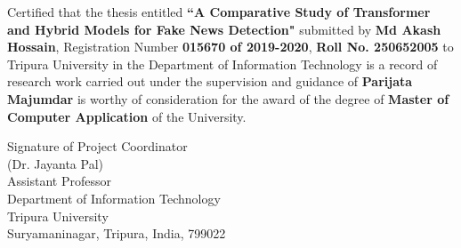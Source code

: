 \noindent Certified that the thesis entitled {\bf ``A Comparative Study of Transformer and Hybrid Models for Fake News Detection"} submitted by {\bf Md Akash Hossain}, Registration Number {\bf 015670 of 2019-2020}, {\bf Roll No. 250652005} to Tripura University in the Department of Information Technology is a record of research work carried out under the supervision and guidance of {\bf Parijata Majumdar} is worthy of consideration for the award of the degree of {\bf Master of Computer Application} of the University.

\vspace{1.1 in}
\begin{flushright}
Signature of Project Coordinator\\ 
(Dr. Jayanta Pal)\\
Assistant Professor\\
Department of Information Technology\\
Tripura University\\
Suryamaninagar, Tripura, India, 799022 
\end{flushright}

